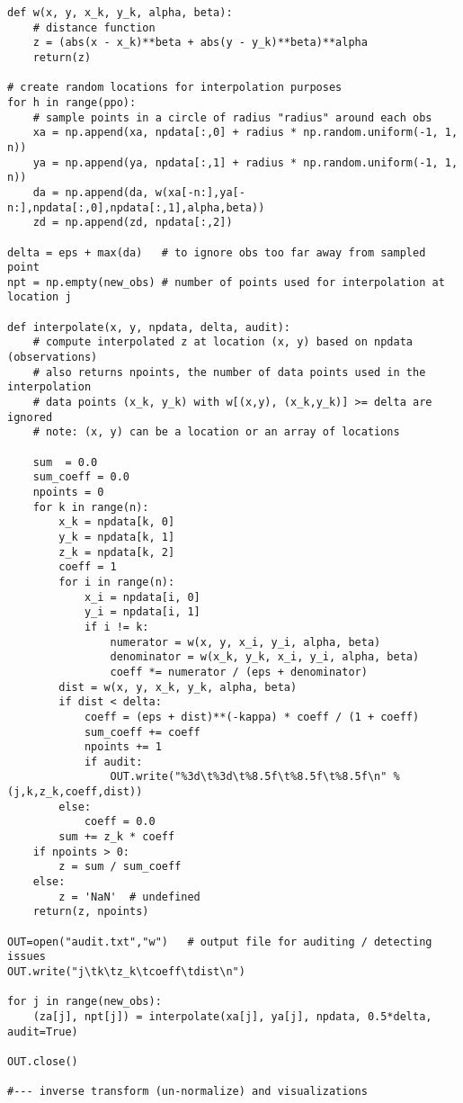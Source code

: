 \documentclass[oneside,10pt]{book}
\begin{document}
\begin{lstlisting}
def w(x, y, x_k, y_k, alpha, beta):
    # distance function
    z = (abs(x - x_k)**beta + abs(y - y_k)**beta)**alpha
    return(z)

# create random locations for interpolation purposes  
for h in range(ppo):
    # sample points in a circle of radius "radius" around each obs 
    xa = np.append(xa, npdata[:,0] + radius * np.random.uniform(-1, 1, n))
    ya = np.append(ya, npdata[:,1] + radius * np.random.uniform(-1, 1, n))
    da = np.append(da, w(xa[-n:],ya[-n:],npdata[:,0],npdata[:,1],alpha,beta))
    zd = np.append(zd, npdata[:,2])

delta = eps + max(da)   # to ignore obs too far away from sampled point
npt = np.empty(new_obs) # number of points used for interpolation at location j

def interpolate(x, y, npdata, delta, audit):
    # compute interpolated z at location (x, y) based on npdata (observations)
    # also returns npoints, the number of data points used in the interpolation
    # data points (x_k, y_k) with w[(x,y), (x_k,y_k)] >= delta are ignored
    # note: (x, y) can be a location or an array of locations

    sum  = 0.0
    sum_coeff = 0.0
    npoints = 0
    for k in range(n):
        x_k = npdata[k, 0]
        y_k = npdata[k, 1]
        z_k = npdata[k, 2]
        coeff = 1
        for i in range(n):
            x_i = npdata[i, 0]
            y_i = npdata[i, 1]
            if i != k:
                numerator = w(x, y, x_i, y_i, alpha, beta)
                denominator = w(x_k, y_k, x_i, y_i, alpha, beta) 
                coeff *= numerator / (eps + denominator) 
        dist = w(x, y, x_k, y_k, alpha, beta)
        if dist < delta:
            coeff = (eps + dist)**(-kappa) * coeff / (1 + coeff) 
            sum_coeff += coeff
            npoints += 1
            if audit:
                OUT.write("%3d\t%3d\t%8.5f\t%8.5f\t%8.5f\n" % (j,k,z_k,coeff,dist))
        else:
            coeff = 0.0
        sum += z_k * coeff  
    if npoints > 0:
        z = sum / sum_coeff 
    else:
        z = 'NaN'  # undefined
    return(z, npoints)

OUT=open("audit.txt","w")   # output file for auditing / detecting issues
OUT.write("j\tk\tz_k\tcoeff\tdist\n")

for j in range(new_obs):
    (za[j], npt[j]) = interpolate(xa[j], ya[j], npdata, 0.5*delta, audit=True)

OUT.close()

#--- inverse transform (un-normalize) and visualizations


\end{lstlisting}
\end{document}

